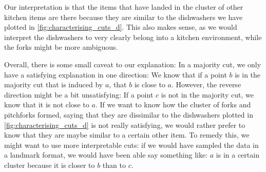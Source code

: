 Our interpretation is that the items that have landed in the cluster of other kitchen items are there because they are similar to
the dishwashers we have plotted in \autoref{fig:characterising_cuts_d}. This also makes sense, as we would interpret the dishwashers to very clearly belong into a kitchen environment, while the forks might be more ambiguous.

Overall, there is some small caveat to our explanation: In a majority cut, we only have a satisfying explanation in one direction: We know that if a point $b$ is in the majority cut that is induced by
$a$, that $b$ is close to $a$. However, the reverse direction might be a bit unsatisfying: If a point $c$ is not in the majority cut, we know that it is not close to $a$. If we want to know how the cluster
of forks and pitchforks formed, saying that they are dissimilar to the dishwashers plotted in \autoref{fig:characterising_cuts_d} is not really satisfying, we would rather prefer to know that they are maybe
similar to a certain other item. To remedy this, we might want to use more interpretable cuts: if we would have sampled the data in a landmark format, we would have been able say something like: $a$ is in a certain cluster
because it is closer to $b$ than to $c$.


